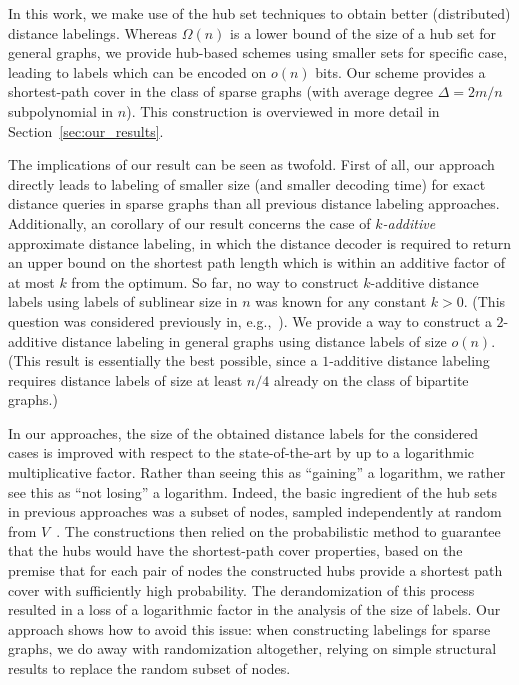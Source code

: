\documentclass{article}[11pt,letter]
\begin{document}
In this work, we make use of the hub set techniques to obtain better (distributed) distance labelings. Whereas $\Omega(n)$ is a lower bound of the size of a hub set for general graphs, we provide hub-based schemes using smaller sets for specific case, leading to labels which can be encoded on $o(n)$ bits. Our scheme provides a shortest-path cover in the class of sparse graphs (with average degree $\Delta=2m/n$ subpolynomial in $n$). This construction is overviewed in more detail in Section~\ref{sec:our_results}.

The implications of our result can be seen as twofold. First of all, our approach directly leads to labeling of smaller size (and smaller decoding time) for exact distance queries in sparse graphs than all previous distance labeling approaches. Additionally, an corollary of our result concerns the case of \emph{$k$-additive} approximate distance labeling, in which the distance decoder is required to return an upper bound on the shortest path length which is within an additive factor of at most $k$ from the optimum. So far, no way to construct $k$-additive distance labels using labels of sublinear size in $n$ was known for any constant $k>0$. (This question was considered previously in, e.g.,~\cite{DBLP:conf/soda/AlstrupGHP16}). We provide a way to construct a $2$-additive distance labeling in general graphs using distance labels of size $o(n)$. (This result is essentially the best possible, since a $1$-additive distance labeling requires distance labels of size at least $n/4$ already on the class of bipartite graphs.)

In our approaches, the size of the obtained distance labels for the considered cases is improved with respect to the state-of-the-art by up to a logarithmic multiplicative factor. Rather than seeing this as ``gaining'' a logarithm, we rather see this as ``not losing'' a logarithm. Indeed, the basic ingredient of the hub sets in previous approaches was a subset of nodes, sampled independently at random from $V$~\cite{BCE05,Sublinear}. The constructions then relied on the probabilistic method to guarantee that the hubs would have the shortest-path cover properties, based on the premise that for each pair of nodes the constructed hubs provide a shortest path cover with sufficiently high probability. The derandomization of this process resulted in a loss of a logarithmic factor in the analysis of the size of labels. Our approach shows how to avoid this issue: when constructing labelings for sparse graphs, we do away with randomization altogether, relying on simple structural results to replace the random subset of nodes.
\end{document}
